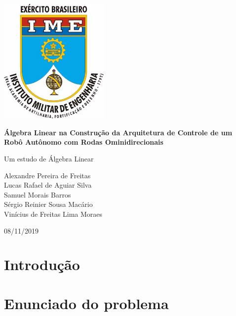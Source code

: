 \documentclass{article}
\begin{document}
\begin{titlepage}
    \begin{center}

        \includegraphics[width=0.4\textwidth]{ime.jpg}

        \vspace{1cm}

        \Huge
        \textbf{Álgebra Linear na Construção da Arquitetura de Controle de um Robô Autônomo com Rodas Ominidirecionais}
 
        \vspace{0.5cm}
        \LARGE
        Um estudo de Álgebra Linear
 
        \vspace{1.5cm}
 
        Alexandre Pereira de Freitas\\
        Lucas Rafael de Aguiar Silva\\
        Samuel Morais Barros\\
        Sérgio Reinier Sousa Macário\\
        Vinícius de Freitas Lima Moraes\\
 
        \vfill
 
        \vspace{0.8cm}
 
        \Large
        08/11/2019
 
    \end{center}
\end{titlepage}

\tableofcontents
\newpage

\section{Introdução}

\section{Enunciado do problema}
\end{document}
